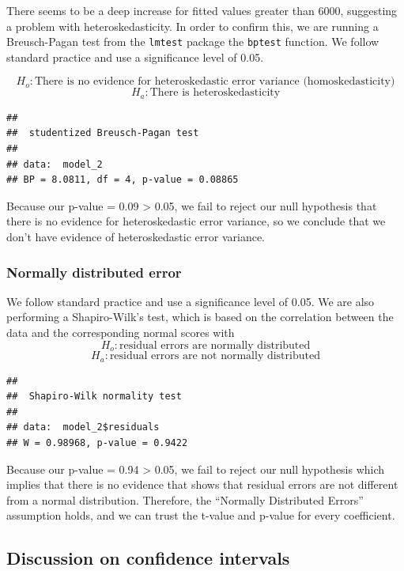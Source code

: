 \documentclass[
]{article}
\begin{document}
There seems to be a deep increase for fitted values greater than 6000,
suggesting a problem with heteroskedasticity. In order to confirm this,
we are running a Breusch-Pagan test from the \texttt{lmtest} package the
\texttt{bptest} function. We follow standard practice and use a
significance level of 0.05.

\[H_o: \text{There is no evidence for heteroskedastic error variance (homoskedasticity)}\]
\[H_a: \text{There is heteroskedasticity}\]

\begin{verbatim}
## 
##  studentized Breusch-Pagan test
## 
## data:  model_2
## BP = 8.0811, df = 4, p-value = 0.08865
\end{verbatim}

Because our p-value = 0.09 \textgreater{} 0.05, we fail to reject our
null hypothesis that there is no evidence for heteroskedastic error
variance, so we conclude that we don't have evidence of heteroskedastic
error variance.

\hypertarget{normally-distributed-error}{%
\subsubsection{Normally distributed
error}\label{normally-distributed-error}}

We follow standard practice and use a significance level of 0.05. We are
also performing a Shapiro-Wilk's test, which is based on the correlation
between the data and the corresponding normal scores with
\[H_o: \text{residual errors are normally distributed}\]
\[H_a: \text{residual errors are not normally distributed}\]

\begin{verbatim}
## 
##  Shapiro-Wilk normality test
## 
## data:  model_2$residuals
## W = 0.98968, p-value = 0.9422
\end{verbatim}

Because our p-value = 0.94 \textgreater{} 0.05, we fail to reject our
null hypothesis which implies that there is no evidence that shows that
residual errors are not different from a normal distribution. Therefore,
the ``Normally Distributed Errors'' assumption holds, and we can trust
the t-value and p-value for every coefficient.

\hypertarget{discussion-on-confidence-intervals}{%
\subsection{Discussion on confidence
intervals}\label{discussion-on-confidence-intervals}}
\end{document}
